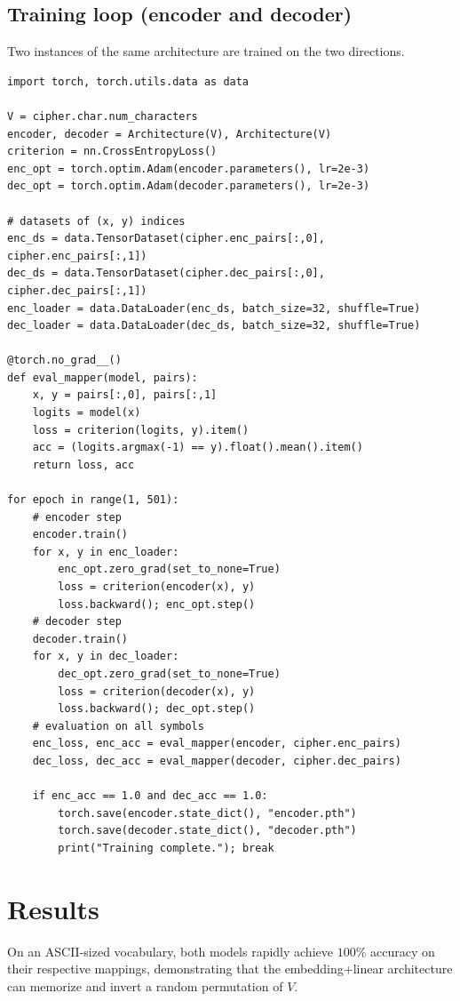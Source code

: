 \documentclass[12pt]{article}
\theoremstyle{plain}
\theoremstyle{remark}
\begin{document}
\subsection{Training loop (encoder and decoder)}
Two instances of the same architecture are trained on the two directions.
\begin{verbatim}
import torch, torch.utils.data as data

V = cipher.char.num_characters
encoder, decoder = Architecture(V), Architecture(V)
criterion = nn.CrossEntropyLoss()
enc_opt = torch.optim.Adam(encoder.parameters(), lr=2e-3)
dec_opt = torch.optim.Adam(decoder.parameters(), lr=2e-3)

# datasets of (x, y) indices
enc_ds = data.TensorDataset(cipher.enc_pairs[:,0], cipher.enc_pairs[:,1])
dec_ds = data.TensorDataset(cipher.dec_pairs[:,0], cipher.dec_pairs[:,1])
enc_loader = data.DataLoader(enc_ds, batch_size=32, shuffle=True)
dec_loader = data.DataLoader(dec_ds, batch_size=32, shuffle=True)

@torch.no_grad__()
def eval_mapper(model, pairs):
    x, y = pairs[:,0], pairs[:,1]
    logits = model(x)
    loss = criterion(logits, y).item()
    acc = (logits.argmax(-1) == y).float().mean().item()
    return loss, acc

for epoch in range(1, 501):
    # encoder step
    encoder.train()
    for x, y in enc_loader:
        enc_opt.zero_grad(set_to_none=True)
        loss = criterion(encoder(x), y)
        loss.backward(); enc_opt.step()
    # decoder step
    decoder.train()
    for x, y in dec_loader:
        dec_opt.zero_grad(set_to_none=True)
        loss = criterion(decoder(x), y)
        loss.backward(); dec_opt.step()
    # evaluation on all symbols
    enc_loss, enc_acc = eval_mapper(encoder, cipher.enc_pairs)
    dec_loss, dec_acc = eval_mapper(decoder, cipher.dec_pairs)

    if enc_acc == 1.0 and dec_acc == 1.0:
        torch.save(encoder.state_dict(), "encoder.pth")
        torch.save(decoder.state_dict(), "decoder.pth")
        print("Training complete."); break
\end{verbatim}

\section{Results}
On an ASCII-sized vocabulary, both models rapidly achieve $100\%$ accuracy on their respective mappings, demonstrating that the embedding+linear architecture can memorize and invert a random permutation of $V$.
\end{document}
